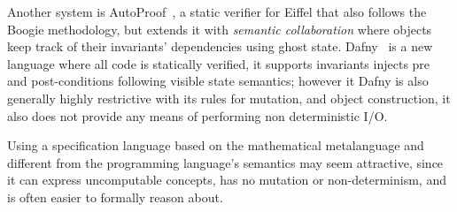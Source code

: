 Another system is AutoProof~\cite{DBLP:conf/fm/PolikarpovaTFM14}, a static verifier for Eiffel that also follows the Boogie methodology, but extends it with \emph{semantic collaboration} where objects keep track of their invariants' dependencies using ghost state.
Dafny~\cite{DBLP:conf/sigada/Leino12} is a new language where all code is statically verified, it supports invariants injects pre and post-conditions following visible state semantics;
however it 
Dafny is also generally highly restrictive with its rules for mutation, and object construction, it also does not provide any means of performing non deterministic I/O.






Using a specification language based on the mathematical metalanguage and different from the programming language's semantics may seem attractive, since it can express uncomputable concepts, has no mutation or non-determinism, and is often easier to formally reason about.


